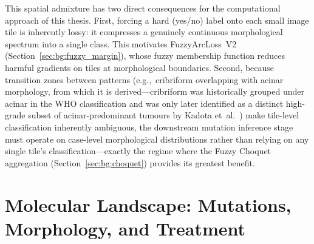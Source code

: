 This spatial admixture has two direct consequences for the computational
approach of this thesis.
First, forcing a hard (yes/no) label onto each small image tile is
inherently lossy: it compresses a genuinely continuous morphological
spectrum into a single class.
This motivates FuzzyArcLoss~V2 (Section~\ref{sec:bg:fuzzy_margin}),
whose fuzzy membership function reduces harmful gradients on tiles at
morphological boundaries.
Second, because transition zones between patterns
(e.g.,~cribriform overlapping with acinar morphology, from which it
is derived---cribriform was historically grouped under acinar in the
WHO classification and was only later identified as a distinct
high-grade subset of acinar-predominant tumours by Kadota
et~al.~\cite{kadota2014cribriform})
make tile-level classification inherently ambiguous, the downstream
mutation inference stage must operate on case-level morphological
distributions rather than relying on any single tile's
classification---exactly the
regime where the Fuzzy Choquet aggregation
(Section~\ref{sec:bg:choquet}) provides its greatest benefit.


\section{Molecular Landscape: Mutations, Morphology, and Treatment}
\label{sec:uc:molecular_landscape}

